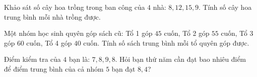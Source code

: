 \begin{ex} %
Khảo sát số cây hoa trồng trong ban công của $4$ nhà: $8, 12, 15, 9$. Tính số cây hoa trung bình mỗi nhà trồng được.
\end{ex}

\begin{ex} %
Một nhóm học sinh quyên góp sách cũ: Tổ 1 góp $45$ cuốn, Tổ 2 góp $55$ cuốn, Tổ 3 góp $60$ cuốn, Tổ 4 góp $40$ cuốn. Tính số sách trung bình mỗi tổ quyên góp được.
\end{ex}

\begin{ex} %
Điểm kiểm tra của $4$ bạn là: $7, 8, 9, 8$. Hỏi bạn thứ năm cần đạt bao nhiêu điểm để điểm trung bình của cả nhóm $5$ bạn đạt $8{,}4$?
\end{ex}
